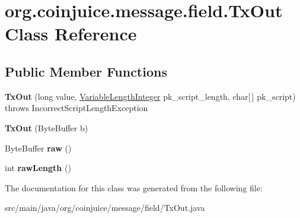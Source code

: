 \hypertarget{classorg_1_1coinjuice_1_1message_1_1field_1_1_tx_out}{\section{org.\-coinjuice.\-message.\-field.\-Tx\-Out Class Reference}
\label{classorg_1_1coinjuice_1_1message_1_1field_1_1_tx_out}
}
\subsection*{Public Member Functions}
\begin{DoxyCompactItemize}
\item 
\hypertarget{classorg_1_1coinjuice_1_1message_1_1field_1_1_tx_out_a126a8ea515eb8472a0e7d5811a3d5f7b}{{\bfseries Tx\-Out} (long value, \hyperlink{classorg_1_1coinjuice_1_1message_1_1field_1_1_variable_length_integer}{Variable\-Length\-Integer} pk\-\_\-script\-\_\-length, char\mbox{[}$\,$\mbox{]} pk\-\_\-script)  throws Incorrect\-Script\-Length\-Exception }\label{classorg_1_1coinjuice_1_1message_1_1field_1_1_tx_out_a126a8ea515eb8472a0e7d5811a3d5f7b}

\item 
\hypertarget{classorg_1_1coinjuice_1_1message_1_1field_1_1_tx_out_adb056fef807e922a6017171c0c702038}{{\bfseries Tx\-Out} (Byte\-Buffer b)}\label{classorg_1_1coinjuice_1_1message_1_1field_1_1_tx_out_adb056fef807e922a6017171c0c702038}

\item 
\hypertarget{classorg_1_1coinjuice_1_1message_1_1field_1_1_tx_out_a185d275212a61622e1dee99851c723d5}{Byte\-Buffer {\bfseries raw} ()}\label{classorg_1_1coinjuice_1_1message_1_1field_1_1_tx_out_a185d275212a61622e1dee99851c723d5}

\item 
\hypertarget{classorg_1_1coinjuice_1_1message_1_1field_1_1_tx_out_a0d625f3ae692abadec782e07398fa4a7}{int {\bfseries raw\-Length} ()}\label{classorg_1_1coinjuice_1_1message_1_1field_1_1_tx_out_a0d625f3ae692abadec782e07398fa4a7}

\end{DoxyCompactItemize}


The documentation for this class was generated from the following file\-:\begin{DoxyCompactItemize}
\item 
src/main/java/org/coinjuice/message/field/Tx\-Out.\-java\end{DoxyCompactItemize}
